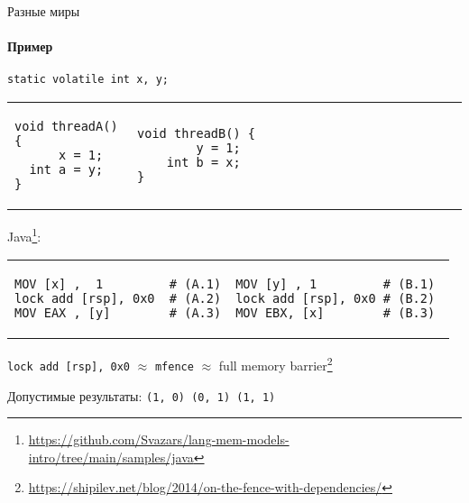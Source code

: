 \begin{frame}{Разные миры}
\framesubtitle{Пример}

\begin{verbatim}
static volatile int x, y; 
\end{verbatim}

\begin{tabular}{p{} p{}}

\begin{verbatim}
void threadA() {
      x = 1;
  int a = y;
}
\end{verbatim}

& 

\begin{verbatim}
void threadB() {                                   
        y = 1;                           
    int b = x;                           
}                    
\end{verbatim}
\end{tabular}

\vspace{-0.5cm}
Java\footnote{\tiny\url{https://github.com/Svazars/lang-mem-models-intro/tree/main/samples/java}}:


\begin{tabular}{p{} p{}}
\begin{verbatim}
MOV [x] ,  1         # (A.1)
lock add [rsp], 0x0  # (A.2)
MOV EAX , [y]        # (A.3)
\end{verbatim}

& 

\begin{verbatim}
MOV [y] , 1         # (B.1) 
lock add [rsp], 0x0 # (B.2)
MOV EBX, [x]        # (B.3) 
\end{verbatim}
\end{tabular}

\pause
\vspace{-0.5cm}
\texttt{lock add [rsp], 0x0} $\approx$ \texttt{mfence} $\approx$ full memory barrier\footnote<2->{\tiny\url{https://shipilev.net/blog/2014/on-the-fence-with-dependencies/}}

\pause
Допустимые результаты: \texttt{(1, 0) (0, 1) (1, 1)}

\end{frame}


